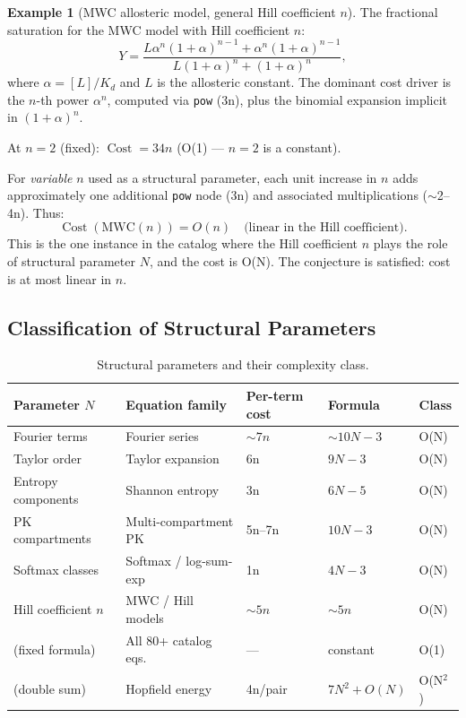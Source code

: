 \documentclass[12pt,a4paper]{article}
\theoremstyle{definition}
\newtheorem{example}[theorem]{Example}
\newcommand{\Cost}{\operatorname{Cost}}
\begin{document}
\begin{example}[MWC allosteric model, general Hill coefficient $n$]
\label{ex:mwc}
The fractional saturation for the MWC model with Hill coefficient $n$:
\[
  Y = \frac{L \alpha^n (1 + \alpha)^{n-1} + \alpha^n (1 + \alpha)^{n-1}}
           {L(1 + \alpha)^n + (1 + \alpha)^n},
\]
where $\alpha = [L]/K_d$ and $L$ is the allosteric constant.
The dominant cost driver is the $n$-th power $\alpha^n$, computed via
\texttt{pow} (3n), plus the binomial expansion implicit in $(1+\alpha)^n$.

At $n=2$ (fixed): $\Cost = 34n$ (O(1) --- $n=2$ is a constant).

For \emph{variable} $n$ used as a structural parameter, each unit
increase in $n$ adds approximately one additional \texttt{pow} node
(3n) and associated multiplications ($\sim$2--4n).  Thus:
\[
  \Cost(\mathrm{MWC}(n)) = O(n) \quad \text{(linear in the Hill coefficient)}.
\]
This is the one instance in the catalog where the Hill coefficient $n$
plays the role of structural parameter $N$, and the cost is O(N).
The conjecture is satisfied: cost is at most linear in $n$.
\end{example}

\subsection{Classification of Structural Parameters}

\begin{table}[h]
\centering
\caption{Structural parameters and their complexity class.}
\label{tab:structural_params}
\smallskip
\begin{tabular}{@{}lllll@{}}
\toprule
\textbf{Parameter $N$} & \textbf{Equation family} & \textbf{Per-term cost} & \textbf{Formula} & \textbf{Class} \\
\midrule
Fourier terms          & Fourier series        & $\sim 7n$ & $\sim 10N-3$ & O(N) \\
Taylor order           & Taylor expansion      & 6n        & $9N-3$       & O(N) \\
Entropy components     & Shannon entropy       & 3n        & $6N-5$       & O(N) \\
PK compartments        & Multi-compartment PK  & 5n--7n    & $10N-3$      & O(N) \\
Softmax classes        & Softmax / log-sum-exp & 1n        & $4N-3$       & O(N) \\
Hill coefficient $n$   & MWC / Hill models     & $\sim 5n$ & $\sim 5n$    & O(N) \\
\midrule
(fixed formula)        & All 80+ catalog eqs.  & ---       & constant     & O(1) \\
(double sum)           & Hopfield energy       & 4n/pair   & $7N^2+O(N)$  & O(N$^2$) \\
\bottomrule
\end{tabular}
\end{table}
\end{document}
